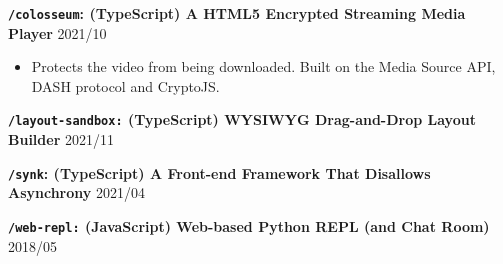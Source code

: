\documentclass[9pt]{article}
\begin{document}
\vspace{0.5em}
\textbf{\texttt{/colosseum}:  (TypeScript) A HTML5 Encrypted Streaming Media Player}   \hfill 2021/10
\begin{itemize}
\item Protects the video from being downloaded. Built on the Media Source API, DASH protocol and CryptoJS.
\end{itemize}


\vspace{0.5em}
\textbf{\texttt{/layout-sandbox:} (TypeScript) WYSIWYG Drag-and-Drop Layout Builder} \hfill 2021/11

\vspace{0.5em}
\textbf{\texttt{/synk}:  (TypeScript) A Front-end Framework That Disallows Asynchrony} \hfill 2021/04

\vspace{0.5em}
\textbf{\texttt{/web-repl:} (JavaScript) Web-based Python REPL (and Chat Room)}  \hfill 2018/05 
\end{document}
